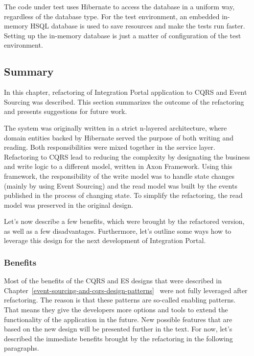 \documentclass{book}
\begin{document}
The code under test uses Hibernate to access the database in a uniform
way, regardless of the database type. For the test environment, an
embedded in-memory HSQL database is used to save resources and make the
tests run faster. Setting up the in-memory database is just a matter of
configuration of the test environment.


\subsection{Summary}\label{summary}

In this chapter, refactoring of Integration Portal application to CQRS
and Event Sourcing was described. This section summarizes the outcome of
the refactoring and presents suggestions for future work.

The system was originally written in a strict n-layered architecture,
where domain entities backed by Hibernate served the purpose of both
writing and reading. Both responsibilities were mixed together in the
service layer. Refactoring to CQRS lead to reducing the complexity by
designating the business and write logic to a different model, written
in Axon Framework. Using this framework, the responsibility of the write
model was to handle state changes (mainly by using Event Sourcing) and
the read model was built by the events published in the process of
changing state. To simplify the refactoring, the read model was
preserved in the original design.

Let's now describe a few benefits, which were brought by the refactored
version, as well as a few disadvantages. Furthermore, let's outline some
ways how to leverage this design for the next development of Integration
Portal.

\subsubsection{Benefits}\label{benefits}

Most of the benefits of the CQRS and ES designs that were described in Chapter~\ref{event-sourcing-and-cqrs-design-patterns}~ were not fully
leveraged after refactoring. The reason is that these patterns are
so-called enabling patterns. That means they give the developers more
options and tools to extend the functionality of the application in the
future. New possible features that are based on the new design will be
presented further in the text. For now, let's described the immediate
benefits brought by the refactoring in the following paragraphs.
\end{document}
